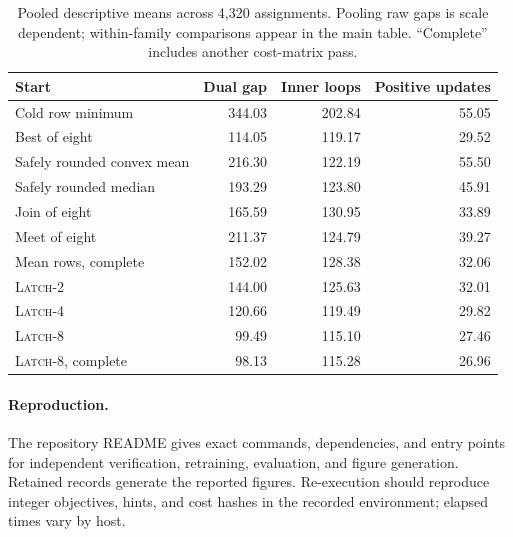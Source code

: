 \documentclass[10pt,letterpaper]{article}
\newcommand{\LATCH}{\textsc{Latch}}
\begin{document}
\begin{table}[H]
\centering\small
\caption{Pooled descriptive means across 4,320 assignments. Pooling raw gaps is scale dependent; within-family comparisons appear in the main table. ``Complete'' includes another cost-matrix pass.}
\begin{tabular}{lrrr}\toprule
Start & Dual gap & Inner loops & Positive updates\\\midrule
Cold row minimum &344.03&202.84&55.05\\
Best of eight &114.05&119.17&29.52\\
Safely rounded convex mean &216.30&122.19&55.50\\
Safely rounded median &193.29&123.80&45.91\\
Join of eight &165.59&130.95&33.89\\
Meet of eight &211.37&124.79&39.27\\
Mean rows, complete &152.02&128.38&32.06\\
\LATCH{}-2 &144.00&125.63&32.01\\
\LATCH{}-4 &120.66&119.49&29.82\\
\LATCH{}-8 &99.49&115.10&27.46\\
\LATCH{}-8, complete &98.13&115.28&26.96\\\bottomrule
\end{tabular}
\end{table}

\paragraph{Reproduction.}
The repository README gives exact commands, dependencies, and entry points for independent verification, retraining, evaluation, and figure generation. Retained records generate the reported figures. Re-execution should reproduce integer objectives, hints, and cost hashes in the recorded environment; elapsed times vary by host.
\end{document}
